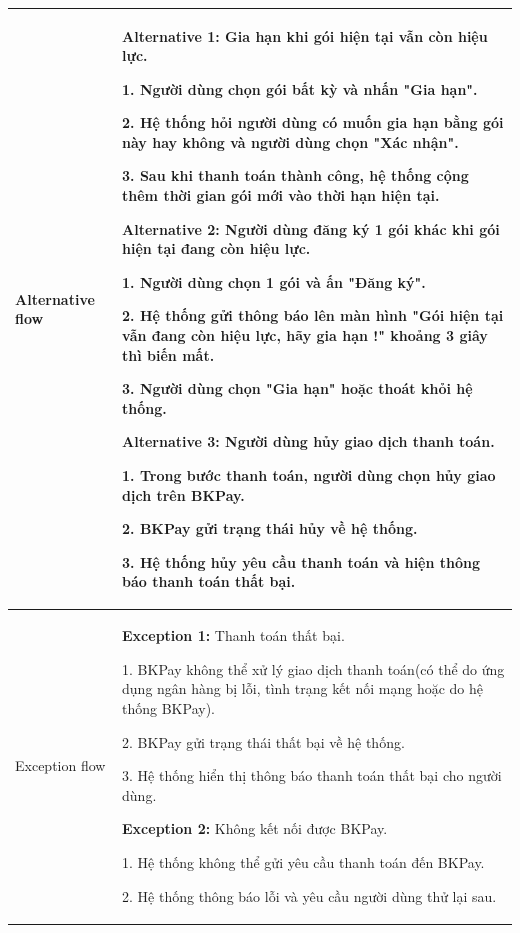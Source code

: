 \begin{center}
    \begin{tabular}{|m{2.5cm}|m{13cm}|}
    \hline
        Alternative flow & 
        \textbf{Alternative 1:} Gia hạn khi gói hiện tại vẫn còn hiệu lực.
        
        1. Người dùng chọn gói bất kỳ và nhấn "Gia hạn".

        2. Hệ thống hỏi người dùng có muốn gia hạn bằng gói này hay không và người dùng chọn "Xác nhận".
        
        3. Sau khi thanh toán thành công, hệ thống cộng thêm thời gian gói mới vào thời hạn hiện tại. 
        
         \textbf{Alternative 2:} Người dùng đăng ký 1 gói khác khi gói hiện tại đang còn hiệu lực.
        
        1. Người dùng chọn 1 gói và ấn "Đăng ký".

        2. Hệ thống gửi thông báo lên màn hình "Gói hiện tại vẫn đang còn hiệu lực, hãy gia hạn !" khoảng 3 giây thì biến mất.

        3. Người dùng chọn "Gia hạn" hoặc thoát khỏi hệ thống.

         \textbf{Alternative 3:} Người dùng hủy giao dịch thanh toán.
        
        1. Trong bước thanh toán, người dùng chọn hủy giao dịch trên BKPay.

        2. BKPay gửi trạng thái hủy về hệ thống.

        3. Hệ thống hủy yêu cầu thanh toán và hiện thông báo thanh toán thất bại.
        \\ 
    \hline
        Exception flow & 
        \textbf{Exception 1:} Thanh toán thất bại.
        
        1. BKPay không thể xử lý giao dịch thanh toán(có thể do ứng dụng ngân hàng bị lỗi, tình trạng kết nối mạng hoặc do hệ thống BKPay).

        2. BKPay gửi trạng thái thất bại về hệ thống.

        3. Hệ thống hiển thị thông báo thanh toán thất bại cho người dùng.

        \textbf{Exception 2:} Không kết nối được BKPay.
        
        1. Hệ thống không thể gửi yêu cầu thanh toán đến BKPay.

        2. Hệ thống thông báo lỗi và yêu cầu người dùng thử lại sau.\\
        \hline
    \end{tabular}
\end{center}